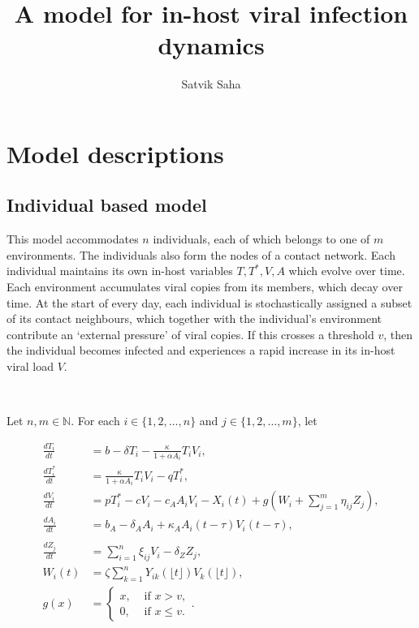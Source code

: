 \documentclass[11pt]{article}
\title{A model for in-host viral infection dynamics}
\author{Satvik Saha}
\date{}
\numberwithin{equation}{subsection}
\begin{document}
    \maketitle

    \section{Model descriptions}

    \subsection{Individual based model} \label{model:individual}

    This model accommodates $n$ individuals, each of which belongs to one of
    $m$ environments. The individuals also form the nodes of a contact
    network. Each individual maintains its own in-host variables $T, T^*, V,
    A$ which evolve over time. Each environment accumulates viral copies from
    its members, which decay over time. At the start of every day, each
    individual is stochastically assigned a subset of its contact neighbours,
    which together with the individual's environment contribute an `external
    pressure' of viral copies. If this crosses a threshold $v$, then the
    individual becomes infected and experiences a rapid increase in its
    in-host viral load $V$.

    ~

    Let $n, m \in \mathbb{N}$. For each $i \in \{1, 2, \dots, n\}$ and $j \in
    \{1, 2, \dots, m\}$, let

    \begin{align}
        \frac{dT_i}{dt} &= b -  \delta T_i - \frac{\kappa}{1 + \alpha A_i} T_iV_i, \\
        \frac{dT^*_i}{dt} &= \frac{\kappa}{1 + \alpha A_i} T_iV_i - qT^*_i, \\
        \frac{dV_i}{dt} &= pT^*_i - cV_i - c_A A_iV_i - X_i(t) + g\left(W_i + \sum_{j = 1}^m \eta_{ij} Z_j\right), \\
        \frac{dA_i}{dt} &= b_A -  \delta_A A_i + \kappa_A A_i(t - \tau)V_i(t - \tau), \\\\
        \frac{dZ_j}{dt} &= \sum_{i = 1}^n \xi_{ij} V_i - \delta_Z Z_j, \\
        W_i(t) &= \zeta \sum_{k = 1}^n Y_{ik}(\lfloor t\rfloor) V_k(\lfloor t\rfloor), \\
        g(x) &= \begin{cases}
            x, &\text{ if } x > v, \\
            0, &\text{ if } x \leq v.
        \end{cases}.
    \end{align}
\end{document}
